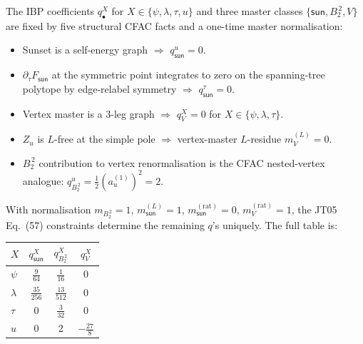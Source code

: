 \documentclass[11pt,a4paper]{article}
\theoremstyle{definition}
\theoremstyle{plain}
\begin{document}
\begin{cfacbox}
The IBP coefficients $q^X_\bullet$ for $X \in \{\psi, \lambda, \tau,
u\}$ and three master classes $\{\textsf{sun}, B_2^{\,2}, V\}$ are
fixed by five structural CFAC facts and a one-time master
normalisation:
\begin{itemize}[leftmargin=2em]
  \item[\textsf{(S1)}] Sunset is a self-energy graph $\Rightarrow$
    $q^u_{\textsf{sun}} = 0$.
  \item[\textsf{(S2)}] $\partial_\tau F_{\textsf{sun}}$ at the
    symmetric point integrates to zero on the spanning-tree polytope
    by edge-relabel symmetry $\Rightarrow$ $q^\tau_{\textsf{sun}} = 0$.
  \item[\textsf{(S3)}] Vertex master is a 3-leg graph $\Rightarrow$
    $q^X_V = 0$ for $X \in \{\psi, \lambda, \tau\}$.
  \item[\textsf{(S4)}] $Z_u$ is $L$-free at the simple pole
    $\Rightarrow$ vertex-master $L$-residue $m_V^{(L)} = 0$.
  \item[\textsf{(S5)}] $B_2^{\,2}$ contribution to vertex
    renormalisation is the CFAC nested-vertex analogue:
    $q^u_{B_2^{\,2}} = \tfrac{1}{2}(a_u^{(1)})^2 = 2$.
\end{itemize}
With normalisation $m_{B_2^{\,2}} = 1$, $m_{\textsf{sun}}^{(L)} = 1$,
$m_{\textsf{sun}}^{(\text{rat})} = 0$, $m_V^{(\text{rat})} = 1$, the
JT05 Eq.~(57) constraints determine the remaining $q$'s uniquely.
The full table is:
\begin{center}
\renewcommand{\arraystretch}{1.15}
\begin{tabular}{@{}lccc@{}}
\toprule
$X$ & $q^X_{\textsf{sun}}$ & $q^X_{B_2^{\,2}}$ & $q^X_V$ \\
\midrule
$\psi$    & $\tfrac{9}{64}$  & $\tfrac{1}{16}$  & $0$ \\
$\lambda$ & $\tfrac{35}{256}$ & $\tfrac{13}{512}$ & $0$ \\
$\tau$    & $0$              & $\tfrac{3}{32}$   & $0$ \\
$u$       & $0$              & $2$               & $-\tfrac{27}{8}$ \\
\bottomrule
\end{tabular}
\end{center}
\end{cfacbox}
\end{document}
